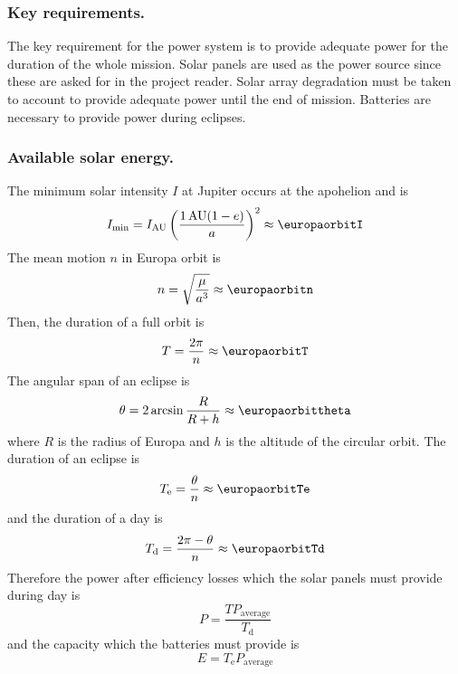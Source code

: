 

\subsubsection{Key requirements.}

The key requirement for the power system is to provide adequate power
for the duration of the whole mission. Solar panels are used as the
power source since these are asked for in the project reader. Solar
array degradation must be taken to account to provide adequate power
until the end of mission. Batteries are necessary to provide power
during eclipses.


\subsubsection{Available solar energy.}

The minimum solar intensity $I$ at Jupiter occurs at the apohelion and is
\begin{equation}
  I_{\mathrm{min}} = I_{\si{AU}} \left(\frac{\SI{1}{AU} (1 - e)}{a}\right)^2
  \approx \europaorbitI
\end{equation}
The mean motion $n$ in Europa orbit is
\begin{equation}
  n = \sqrt{\frac{\mu}{a^3}} \approx \europaorbitn
\end{equation}
Then, the duration of a full orbit is
\begin{equation}
  T = \frac{2 \pi}{n} \approx \europaorbitT
\end{equation}
The angular span of an eclipse is
\begin{equation}
  \theta = 2 \arcsin \frac{R}{R + h} \approx \europaorbittheta
\end{equation}
where $R$ is the radius of Europa and $h$ is the altitude of the
circular orbit. The duration of an eclipse is
\begin{equation}
  T_{\mathrm{e}} = \frac{\theta}{n} \approx \europaorbitTe
\end{equation}
and the duration of a day is
\begin{equation}
  T_{\mathrm{d}} = \frac{2 \pi - \theta}{n} \approx \europaorbitTd
\end{equation}
Therefore the power after efficiency losses which the solar panels
must provide during day is
\begin{equation}
  P = \frac{T P_{\mathrm{average}}}{T_{\mathrm{d}}}
\end{equation}
and the capacity which the batteries must provide is
\begin{equation}
  E = T_{\mathrm{e}} P_{\mathrm{average}}
\end{equation}

